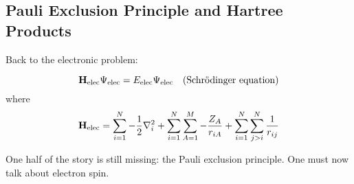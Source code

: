 \documentclass[12pt,a4paper,titlepage]{article}
\newcommand{\trm}[1]{\textrm{#1}} %
\begin{document}
\subsection{Pauli Exclusion Principle and Hartree Products}
Back to the electronic problem:

\begin{equation}
\vb{H}_{\trm{elec}}\Psi_{\trm{elec}}=E_{\trm{elec}}\Psi_{\trm{elec}}\quad(\trm{Schr\"{o}dinger equation})
\end{equation}
where
\begin{equation}
\vb{H}_{\trm{elec}}=\sum_{i=1}^{N}-\frac{1}{2}\nabla_{i}^{2}+\sum_{i=1}^{N}\sum_{A=1}^{M}-\frac{Z_{A}}{r_{iA}}+\sum_{i=1}^{N}\sum_{j>i}^{N}\frac{1}{r_{ij}}
\end{equation}

One half of the story is still missing: the Pauli exclusion principle. One must now talk about electron spin.\\
\end{document}
